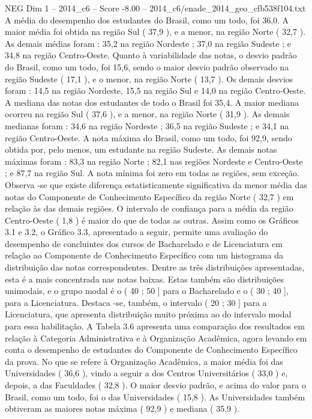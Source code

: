 \begin{textsample}{NEG Dim 1 – 2014\_c6 – Score -8.00 – 2014\_c6/enade\_2014\_geo\_cfb538f104.txt}
A média do desempenho dos estudantes do Brasil, como um todo, foi 36,0.
A maior média foi obtida na região Sul ( 37,9 ), e a menor, na região Norte ( 32,7 ).
As demais médias foram : 35,2 na região Nordeste ; 37,0 na região Sudeste ; e 34,8 na região Centro-Oeste.
Quanto à variabilidade das notas, o desvio padrão do Brasil, como um todo, foi 15,6, sendo o maior desvio padrão observado na região Sudeste ( 17,1 ), e o menor, na região Norte ( 13,7 ).
Os demais desvios foram : 14,5 na região Nordeste, 15,5 na região Sul e 14,0 na região Centro-Oeste.
A mediana das notas dos estudantes de todo o Brasil foi 35,4.
A maior mediana ocorreu na região Sul ( 37,6 ), e a menor, na região Norte ( 31,9 ).
As demais medianas foram : 34,6 na região Nordeste ; 36,5 na região Sudeste ; e 34,1 na região Centro-Oeste.
A nota máxima do Brasil, como um todo, foi 92,9, sendo obtida por, pelo menos, um estudante na região Sudeste.
As demais notas máximas foram : 83,3 na região Norte ; 82,1 nas regiões Nordeste e Centro-Oeste ; e 87,7 na região Sul.
A nota mínima foi zero em todas as regiões, sem exceção.
Observa -se que existe diferença estatisticamente significativa da menor média das notas do Componente de Conhecimento Específico da região Norte ( 32,7 ) em relação às das demais regiões.
O intervalo de confiança para a média da região Centro-Oeste ( 1,8 ) é maior do que de todas as outras.
Assim como os Gráficos 3.1 e 3.2, o Gráfico 3.3, apresentado a seguir, permite uma avaliação do desempenho de concluintes dos cursos de Bacharelado e de Licenciatura em relação ao Componente de Conhecimento Específico com um histograma da distribuição das notas correspondentes.
Dentre as três distribuições apresentadas, esta é a mais concentrada nas notas baixas.
Estas também são distribuições unimodais, e o grupo modal é o ( 40 ; 50 ] para o Bacharelado e o ( 30 ; 40 ], para a Licenciatura.
Destaca -se, também, o intervalo ( 20 ; 30 ] para a Licenciatura, que apresenta distribuição muito próxima ao do intervalo modal para essa habilitação.
A Tabela 3.6 apresenta uma comparação dos resultados em relação à Categoria Administrativa e à Organização Acadêmica, agora levando em conta o desempenho de estudantes do Componente de Conhecimento Específico da prova.
No que se refere à Organização Acadêmica, a maior média foi das Universidades ( 36,6 ), vindo a seguir a dos Centros Universitários ( 33,0 ) e, depois, a das Faculdades ( 32,8 ).
O maior desvio padrão, e acima do valor para o Brasil, como um todo, foi o das Universidades ( 15,8 ).
As Universidades também obtiveram as maiores notas máxima ( 92,9 ) e mediana ( 35,9 ).

\end{textsample}
